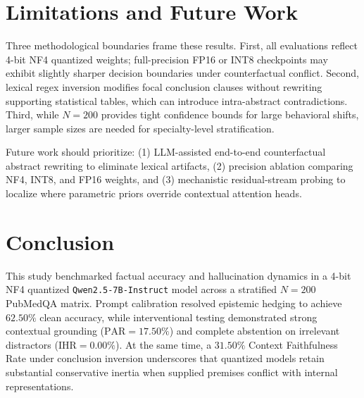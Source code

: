 \documentclass[10pt,twocolumn,letterpaper]{article}
\begin{document}
\section{Limitations and Future Work}
Three methodological boundaries frame these results. First, all evaluations reflect 4-bit NF4 quantized weights; full-precision FP16 or INT8 checkpoints may exhibit slightly sharper decision boundaries under counterfactual conflict. Second, lexical regex inversion modifies focal conclusion clauses without rewriting supporting statistical tables, which can introduce intra-abstract contradictions. Third, while $N=200$ provides tight confidence bounds for large behavioral shifts, larger sample sizes are needed for specialty-level stratification.

Future work should prioritize: (1) LLM-assisted end-to-end counterfactual abstract rewriting to eliminate lexical artifacts, (2) precision ablation comparing NF4, INT8, and FP16 weights, and (3) mechanistic residual-stream probing to localize where parametric priors override contextual attention heads.

\section{Conclusion}
This study benchmarked factual accuracy and hallucination dynamics in a 4-bit NF4 quantized \texttt{Qwen2.5-7B-Instruct} model across a stratified $N=200$ PubMedQA matrix. Prompt calibration resolved epistemic hedging to achieve $62.50\%$ clean accuracy, while interventional testing demonstrated strong contextual grounding ($\text{PAR} = 17.50\%$) and complete abstention on irrelevant distractors ($\text{IHR} = 0.00\%$). At the same time, a $31.50\%$ Context Faithfulness Rate under conclusion inversion underscores that quantized models retain substantial conservative inertia when supplied premises conflict with internal representations.



\end{document}

